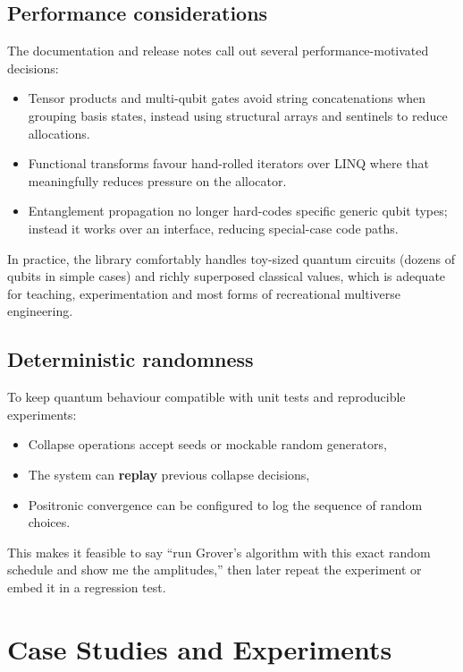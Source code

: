 \documentclass[a4paper,11pt]{article}
\begin{document}
\subsection{Performance considerations}

The documentation and release notes call out several performance-motivated decisions:

\begin{itemize}
\item
  Tensor products and multi-qubit gates avoid string concatenations when grouping basis states, instead using structural arrays and sentinels to reduce allocations.
\item
  Functional transforms favour hand-rolled iterators over LINQ where that meaningfully reduces pressure on the allocator.
\item
  Entanglement propagation no longer hard-codes specific generic qubit types; instead it works over an interface, reducing special-case code paths.
\end{itemize}

In practice, the library comfortably handles toy-sized quantum circuits (dozens of qubits in simple cases) and richly superposed classical values, which is adequate for teaching, experimentation and most forms of recreational multiverse engineering.

\subsection{Deterministic randomness}

To keep quantum behaviour compatible with unit tests and reproducible experiments:

\begin{itemize}
\item
  Collapse operations accept seeds or mockable random generators,
\item
  The system can \textbf{replay} previous collapse decisions,
\item
  Positronic convergence can be configured to log the sequence of random choices.
\end{itemize}

This makes it feasible to say ``run Grover's algorithm with this exact random schedule and show me the amplitudes,'' then later repeat the experiment or embed it in a regression test.

\section{Case Studies and Experiments}
\end{document}

